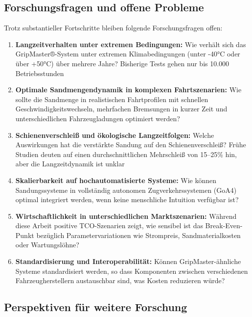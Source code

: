 \documentclass[a4paper,12pt]{article}
\theoremstyle{definition}
\theoremstyle{remark}
\begin{document}
\subsection{Forschungsfragen und offene Probleme}

Trotz substantieller Fortschritte bleiben folgende Forschungsfragen offen:

\begin{enumerate}
	\item \textbf{Langzeitverhalten unter extremen Bedingungen:} Wie verhält sich das GripMaster®-System unter extremen Klimabedingungen (unter -40°C oder über +50°C) über mehrere Jahre? Bisherige Tests gehen nur bis 10.000 Betriebsstunden
	
	\item \textbf{Optimale Sandmengendynamik in komplexen Fahrtszenarien:} Wie sollte die Sandmenge in realistischen Fahrtprofilen mit schnellen Geschwindigkeitswechseln, mehrfachen Bremsungen in kurzer Zeit und unterschiedlichen Fahrzeugladungen optimiert werden?
	
	\item \textbf{Schienenverschleiß und ökologische Langzeitfolgen:} Welche Auswirkungen hat die verstärkte Sandung auf den Schienenverschleiß? Frühe Studien deuten auf einen durchschnittlichen Mehrschleiß von 15--25\% hin, aber die Langzeitdynamik ist unklar
	
	\item \textbf{Skalierbarkeit auf hochautomatisierte Systeme:} Wie können Sandungssysteme in vollständig autonomen Zugverkehrssystemen (GoA4) optimal integriert werden, wenn keine menschliche Intuition verfügbar ist?
	
	\item \textbf{Wirtschaftlichkeit in unterschiedlichen Marktszenarien:} Während diese Arbeit positive TCO-Szenarien zeigt, wie sensibel ist das Break-Even-Punkt bezüglich Parametervariationen wie Strompreis, Sandmaterialkosten oder Wartungslöhne?
	
	\item \textbf{Standardisierung und Interoperabilität:} Können GripMaster-ähnliche Systeme standardisiert werden, so dass Komponenten zwischen verschiedenen Fahrzeugherstellern austauschbar sind, was Kosten reduzieren würde?
\end{enumerate}

\subsection{Perspektiven für weitere Forschung}
\end{document}
